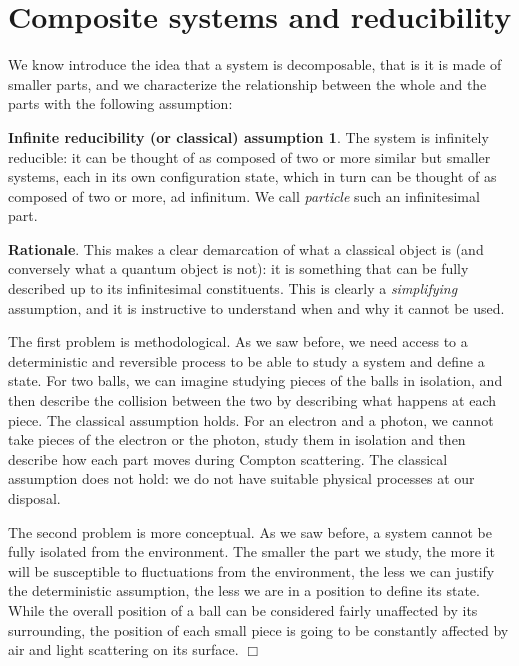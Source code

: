 \documentclass[aps,pra,10pt,twocolumn,floatfix,nofootinbib]{revtex4-1}
\theoremstyle{definition}
\newtheorem*{assump1}{Infinite reducibility (or classical) assumption}
\newenvironment{rationale}{\textbf{Rationale}.}{$\Box$}
\begin{document}
\section{Composite systems and reducibility}

We know introduce the idea that a system is decomposable, that is it is made of smaller parts, and we characterize the relationship between the whole and the parts with the following assumption:

\begin{assump1}\label{classical}
The system is infinitely reducible: it can be thought of as composed of two or more similar but smaller systems, each in its own configuration state, which in turn can be thought of as composed of two or more, ad infinitum. We call \emph{particle} such an infinitesimal part.
\end{assump1}

\begin{rationale}
This makes a clear demarcation of what a classical object is (and conversely what a quantum object is not): it is something that can be fully described up to its infinitesimal constituents. This is clearly a \emph{simplifying} assumption, and it is instructive to understand when and why it cannot be used.

The first problem is methodological. As we saw before, we need access to a deterministic and reversible process to be able to study a system and define a state. For two balls, we can imagine studying pieces of the balls in isolation, and then describe the collision between the two by describing what happens at each piece. The classical assumption holds. For an electron and a photon, we cannot take pieces of the electron or the photon, study them in isolation and then describe how each part moves during Compton scattering. The classical assumption does not hold: we do not have suitable physical processes at our disposal.

The second problem is more conceptual. As we saw before, a system cannot be fully isolated from the environment. The smaller the part we study, the more it will be susceptible to fluctuations from the environment, the less we can justify the deterministic assumption, the less we are in a position to define its state. While the overall position of a ball can be considered fairly unaffected by its surrounding, the position of each small piece is going to be constantly affected by air and light scattering on its surface.
\end{rationale}
\end{document}
